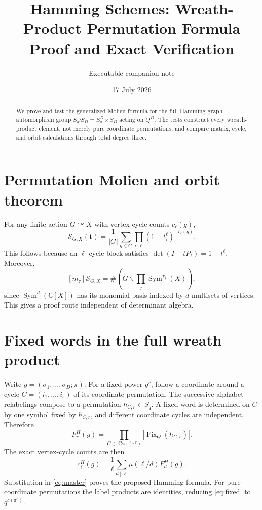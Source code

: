 \documentclass[11pt]{article}
\title{Hamming Schemes: Wreath-Product Permutation Formula\\Proof and Exact Verification}
\author{Executable companion note}
\date{17 July 2026}
\newcommand{\Sym}{\operatorname{Sym}}
\newcommand{\cS}{\mathcal S}
\begin{document}
\maketitle
\begin{abstract}
We prove and test the generalized Molien formula for the full Hamming graph
automorphism group $S_q\wr S_D=S_q^D\rtimes S_D$ acting on $Q^D$.  The tests
construct every wreath-product element, not merely pure coordinate
permutations, and compare matrix, cycle, and orbit calculations through total
degree three.
\end{abstract}

\section{Permutation Molien and orbit theorem}
For any finite action $G\curvearrowright X$ with vertex-cycle counts
$c_\ell(g)$,
\begin{equation}\label{eq:master}
\cS_{G,X}(\mathbf t)=\frac1{|G|}\sum_{g\in G}
\prod_{i,\ell}(1-t_i^\ell)^{-c_\ell(g)}.
\end{equation}
This follows because an $\ell$-cycle block satisfies
$\det(I-tP_\ell)=1-t^\ell$.  Moreover,
\begin{equation}\label{eq:orbit}
[m_\tau]\cS_{G,X}=\#\left(G\backslash
\prod_j\Sym^{\tau_j}(X)\right),
\end{equation}
since $\Sym^d(\mathbb C[X])$ has its monomial basis indexed by $d$-multisets
of vertices.  This gives a proof route independent of determinant algebra.

\section{Fixed words in the full wreath product}
Write $g=(\sigma_1,\ldots,\sigma_D;\pi)$.  For a fixed power $g^r$, follow a
coordinate around a cycle $C=(i_1,\ldots,i_s)$ of its coordinate permutation.
The successive alphabet relabelings compose to a permutation $h_{C,r}\in S_q$.
A fixed word is determined on $C$ by one symbol fixed by $h_{C,r}$, and
different coordinate cycles are independent.  Therefore
\begin{equation}\label{eq:fixed}
F_r^H(g)=\prod_{C\in\operatorname{Cyc}(\pi^r)}
|\operatorname{Fix}_Q(h_{C,r})|.
\end{equation}
The exact vertex-cycle counts are then
\begin{equation}\label{eq:mobius}
c_\ell^H(g)=\frac1\ell\sum_{d\mid\ell}\mu(\ell/d)F_d^H(g).
\end{equation}
Substitution in \eqref{eq:master} proves the proposed Hamming formula.  For
pure coordinate permutations the label products are identities, reducing
\eqref{eq:fixed} to $q^{c(\pi^r)}$.
\end{document}

